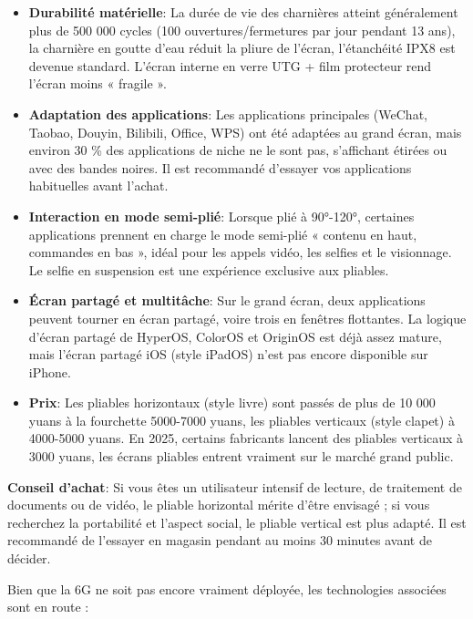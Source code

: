 \begin{itemize}
  \item \textbf{Durabilité matérielle}: La durée de vie des charnières atteint généralement plus de 500 000 cycles (100 ouvertures/fermetures par jour pendant 13 ans), la charnière en goutte d'eau réduit la pliure de l'écran, l'étanchéité IPX8 est devenue standard. L'écran interne en verre UTG + film protecteur rend l'écran moins « fragile ».
  \item \textbf{Adaptation des applications}: Les applications principales (WeChat, Taobao, Douyin, Bilibili, Office, WPS) ont été adaptées au grand écran, mais environ 30 \% des applications de niche ne le sont pas, s'affichant étirées ou avec des bandes noires. Il est recommandé d'essayer vos applications habituelles avant l'achat.
  \item \textbf{Interaction en mode semi-plié}: Lorsque plié à 90°-120°, certaines applications prennent en charge le mode semi-plié « contenu en haut, commandes en bas », idéal pour les appels vidéo, les selfies et le visionnage. Le selfie en suspension est une expérience exclusive aux pliables.
  \item \textbf{Écran partagé et multitâche}: Sur le grand écran, deux applications peuvent tourner en écran partagé, voire trois en fenêtres flottantes. La logique d'écran partagé de HyperOS, ColorOS et OriginOS est déjà assez mature, mais l'écran partagé iOS (style iPadOS) n'est pas encore disponible sur iPhone.
  \item \textbf{Prix}: Les pliables horizontaux (style livre) sont passés de plus de 10 000 yuans à la fourchette 5000-7000 yuans, les pliables verticaux (style clapet) à 4000-5000 yuans. En 2025, certains fabricants lancent des pliables verticaux à 3000 yuans, les écrans pliables entrent vraiment sur le marché grand public.
\end{itemize}

\textbf{Conseil d'achat}: Si vous êtes un utilisateur intensif de lecture, de traitement de documents ou de vidéo, le pliable horizontal mérite d'être envisagé ; si vous recherchez la portabilité et l'aspect social, le pliable vertical est plus adapté. Il est recommandé de l'essayer en magasin pendant au moins 30 minutes avant de décider.


Bien que la 6G ne soit pas encore vraiment déployée, les technologies associées sont en route :


